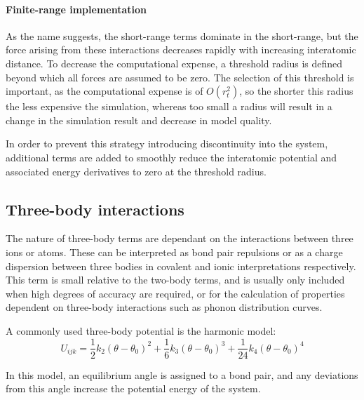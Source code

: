 \vspace{-5pt}
\paragraph{Finite-range implementation}
As the name suggests, the short-range terms dominate in the short-range, but the force arising from these interactions decreases rapidly with increasing interatomic distance.
To decrease the computational expense, a threshold radius is defined beyond which all forces are assumed to be zero.
The selection of this threshold is important, as the computational expense is of $O(r_t^2)$, so the shorter this radius the less expensive the simulation, whereas too small a radius will result in a change in the simulation result and decrease in model quality.

In order to prevent this strategy introducing discontinuity into the system, additional terms are added to smoothly reduce the interatomic potential and associated energy derivatives to zero at the threshold radius. %


\subsection{Three-body interactions}
The nature of three-body terms are dependant on the interactions between three ions or atoms.
These can be interpreted as bond pair repulsions or as a charge dispersion between three bodies in covalent and ionic interpretations respectively.
This term is small relative to the two-body terms, and is usually only included when high degrees of accuracy are required, or for the calculation of properties dependent on three-body interactions such as phonon distribution curves.

A commonly used three-body potential is the harmonic model:
\begin{equation}
  U_{ijk} = \frac{1}{2}k_2(\theta-\theta_0)^2   + \frac{1}{6}k_3(\theta-\theta_0)^3    + \frac{1}{24}k_4(\theta-\theta_0)^4
  \label{eq:threebody}
\end{equation}

In this model, an equilibrium angle is assigned to a bond pair, and any deviations from this angle increase the potential energy of the system.


